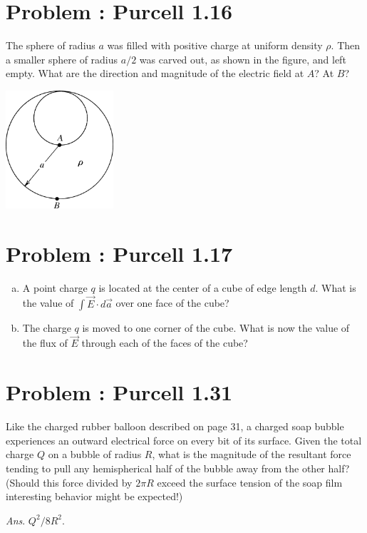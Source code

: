 \documentclass[problems]{esg8022pset}
\date{\today }
\begin{document}
\section{Problem \thesection: Purcell 1.16}
  The sphere of radius $a$ was filled with positive charge at uniform density $\rho$. Then a smaller sphere of radius $a/2$ was carved out, as shown in the figure, and left empty. What are the direction and magnitude of the electric field at $A$? At $B$?
  \begin{center}\includegraphics[width=0.3\textwidth]{ps02_1}\end{center}
\section{Problem \thesection: Purcell 1.17}
  \begin{enumerate}[(a)]
    \item A point charge $q$ is located at the center of a cube of edge length $d$. What is the value of $\int \vec E \cdot d\vec a$ over one face of the cube?
    \item The charge $q$ is moved to one corner of the cube. What is now the value of the flux of $\vec E$ through each of the faces of the cube?
  \end{enumerate}
\section{Problem \thesection: Purcell 1.31}
  Like the charged rubber balloon described on page 31, a charged soap bubble experiences an outward electrical force on every bit of its surface. Given the total charge $Q$ on a bubble of radius $R$, what is the magnitude of the resultant force tending to pull any hemispherical half of the bubble away from the other half? (Should this force divided by $2\pi R$ exceed the surface tension of the soap film interesting behavior might be expected!)

  \begin{flushright}\emph{Ans}. $Q^2/8R^2$.\end{flushright}
\end{document}
